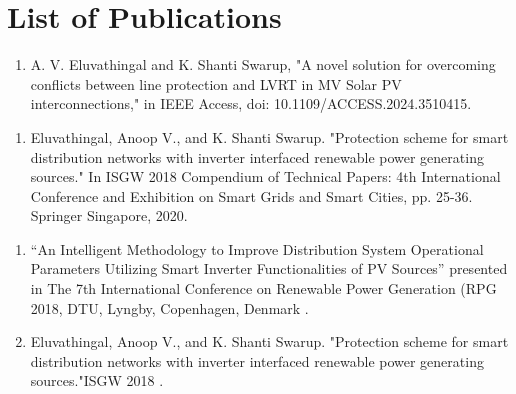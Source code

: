 \chapter*{List of Publications}
\thispagestyle{empty}
\begin{enumerate}[{\bfseries I.}, leftmargin=1cm,itemindent=0em,]
    \begin{enumerate}
        \item A. V. Eluvathingal and K. Shanti Swarup, "A novel solution for overcoming conflicts between line protection and LVRT in MV Solar PV interconnections," in IEEE Access, doi: 10.1109/ACCESS.2024.3510415.
        \par
    \end{enumerate}        

    
    \begin{enumerate}
        \item Eluvathingal, Anoop V., and K. Shanti Swarup. "Protection scheme for smart distribution networks with inverter interfaced renewable power generating sources." In ISGW 2018 Compendium of Technical Papers: 4th International Conference and Exhibition on Smart Grids and Smart Cities, pp. 25-36. Springer Singapore, 2020.

    \end{enumerate} \par
    
    \begin{enumerate}
        \item “An Intelligent Methodology to Improve Distribution System Operational Parameters Utilizing  Smart Inverter Functionalities of PV Sources” presented in The 7th International Conference on  Renewable Power Generation (RPG 2018, DTU, Lyngby, Copenhagen, Denmark . 
 
        \item Eluvathingal, Anoop V., and K. Shanti Swarup. "Protection scheme for smart distribution networks with inverter interfaced renewable power generating sources."ISGW 2018 . 


\end{enumerate}
\end{enumerate}
